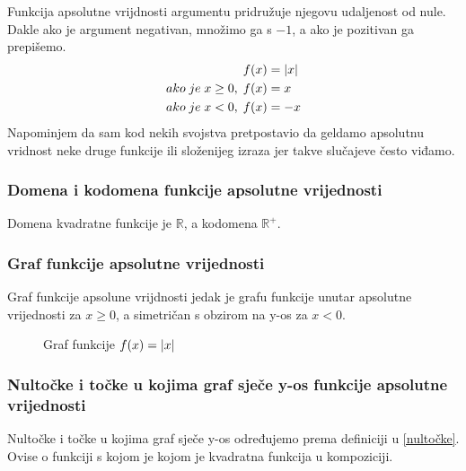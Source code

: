 \newcommand{\aps}{funkcije apsolutne vrijednosti}
    Funkcija apsolutne vrijdnosti argumentu pridružuje njegovu udaljenost od nule.
    Dakle ako je argument negativan, množimo ga s \(-1\), a ako je pozitivan ga prepišemo.
    \begin{equation*}
        \begin{split}
            f(x) &= \abs{x} \\
            ako\;je\;x \geq 0,\; f(x) &= x \\
            ako\;je\;x < 0,\; f(x) &= -x
        \end{split}
    \end{equation*}
    Napominjem da sam kod nekih svojstva pretpostavio da geldamo apsolutnu vridnost neke druge funkcije ili složenijeg izraza jer takve slučajeve često viđamo.

\subsubsection{Domena i kodomena \aps}
    Domena kvadratne funkcije je \(\mathbb{R}\), a kodomena \(\mathbb{R^{+}}\).

\subsubsection{Graf \aps}
    Graf funkcije apsolune vrijdnosti jedak je grafu funkcije unutar apsolutne vrijednosti za \(x \geq 0\), a simetričan s obzirom na y-os za \(x < 0\).
    \begin{figure}[ht]
        \centering
        \caption{Graf funkcije \(f(x) = \abs{x}\)} 
        \label{fig:template}
    \end{figure}

\subsubsection{Nultočke i točke u kojima graf sječe y-os \aps}
    Nultočke i točke u kojima graf sječe y-os određujemo prema definiciji u \ref{nultočke}.
    Ovise o funkciji s kojom je kojom je kvadratna funkcija u kompoziciji.

